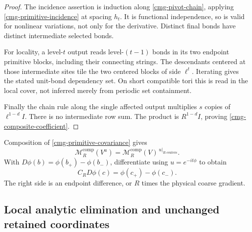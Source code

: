 \begin{proof}
The incidence assertion is induction along
\eqref{cmg-pivot-chain}, applying
\eqref{cmg-primitive-incidence} at spacing $h_t$.
It is functional independence, so is valid for nonlinear variations,
not only for the derivative. Distinct final bonds have distinct
intermediate selected bonds.

For locality, a level-$t$ output reads level-$(t-1)$ bonds in its two
endpoint primitive blocks, including their connecting strings.
The descendants centered at those intermediate sites tile the two
centered blocks of side $\ell^t$. Iterating gives the stated unit-bond
dependency set. On short compatible tori this is read in the local
cover, not inferred merely from periodic set containment.

Finally the chain rule along the single affected output multiplies
$s$ copies of $\ell^{1-d}I$. There is no intermediate row sum.
The product is $R^{1-d}I$, proving
\eqref{cmg-composite-coefficient}.
\end{proof}

Composition of \eqref{cmg-primitive-covariance} gives
\begin{equation}
 \mathcal M_R^{\mathrm{comp}}(V^u)=
 \mathcal M_R^{\mathrm{comp}}(V)^{\,u|_{R\text{-centers}}}.
 \label{cmg-composite-covariance}
\end{equation}
With $D\phi(b)=\phi(b_+)-\phi(b_-)$, differentiate using
$u=e^{-it\phi}$ to obtain
\begin{equation}
 C_RD\phi(c)=\phi(c_+)-\phi(c_-).
 \label{cmg-gradient}
\end{equation}
The right side is an endpoint difference, or $R$ times the physical
coarse gradient.

\subsection{Local analytic elimination and unchanged retained coordinates}
\label{cmg-chart-section}

